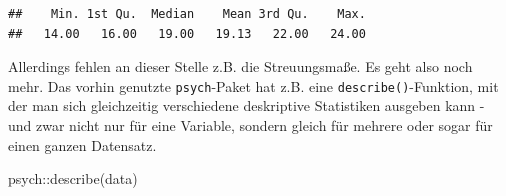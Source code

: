 \documentclass[
]{book}
\newenvironment{Shaded}{\begin{snugshade}}{\end{snugshade}}
\newcommand{\FunctionTok}[1]{\textcolor[rgb]{0.00,0.00,0.00}{#1}}
\newcommand{\NormalTok}[1]{#1}
\newcommand{\SpecialCharTok}[1]{\textcolor[rgb]{0.00,0.00,0.00}{#1}}
\begin{document}
\begin{Shaded}
\end{Shaded}

\begin{verbatim}
##    Min. 1st Qu.  Median    Mean 3rd Qu.    Max. 
##   14.00   16.00   19.00   19.13   22.00   24.00
\end{verbatim}

Allerdings fehlen an dieser Stelle z.B. die Streuungsmaße. Es geht also noch mehr. Das vorhin genutzte \texttt{psych}-Paket hat z.B. eine \texttt{describe()}-Funktion, mit der man sich gleichzeitig verschiedene deskriptive Statistiken ausgeben kann - und zwar nicht nur für eine Variable, sondern gleich für mehrere oder sogar für einen ganzen Datensatz.

\begin{Shaded}
\begin{Highlighting}[]
\NormalTok{psych}\SpecialCharTok{::}\FunctionTok{describe}\NormalTok{(data)}
\end{Highlighting}
\end{Shaded}
\end{document}
